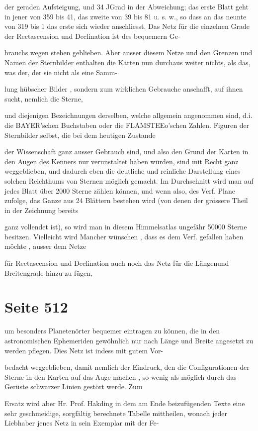 \documentclass[10pt,a4paper]{article}
\begin{document}
der geraden Aufsteigung, und 34 JGrad in der Abweichung; das erste Blatt geht in jener von 359\textdegree{} bis 41\textdegree{}, das zweite von 39\textdegree{} bis 81 u. s. w., so dass an das neunte von 319\textdegree{} bis 1\textdegree{} das erste sich wieder anschliesst. Das Netz für die einzelnen Grade der Rectascension und Declination ist des bequemern Ge-

brauchs wegen stehen geblieben. Aber ausser diesem Netze und den Grenzen und Namen der Sternbilder enthalten die Karten nun durchaus weiter nichts, als das, was der, der sie nicht als eine Samm-

lung hübscher Bilder , sondern zum wirklichen Gebrauche anschafft, auf ihnen sucht, nemlich die Sterne,

und diejenigen Bezeichnungen derselben, welche allgemein angenommen sind, d.i. die BAYER'schen Buchstaben oder die FLAMSTEEo'schen Zahlen. Figuren der Sternbilder selbst, die bei dem heutigen Zustande

der Wissenschaft ganz ausser Gebrauch sind, und also den Grund der Karten in den Augen des Kenners nur verunstaltet haben würden, sind mit Recht ganz weggeblieben, und dadurch eben die deutliche und reinliche Darstellung eines solchen Reichthums von Sternen möglich gemacht. Im Durchschnitt wird man auf jedes Blatt über 2000 Sterne zählen können, und wenn also, des Verf. Plane zufolge, das Ganze aus 24 Blättern bestehen wird (von denen der grössere Theil in der Zeichnung bereits

ganz vollendet ist), so wird man in diesem Himmelsatlas ungefähr 50000 Sterne besitzen. Vielleicht wird Mancher wünschen , dass es dem Verf. gefallen haben möchte , ausser dem Netze

für Rectascension und Declination auch noch das Netz für die Längenund Breitengrade hinzu zu fügen,


\newpage
\section*{Seite 512}
um besonders Planetenörter bequemer eintragen zu können, die in den astronomischen Ephemeriden gewöhnlich nur nach Länge und Breite angesetzt zu werden pflegen. Dies Netz ist indess mit gutem Vor-

bedacht weggeblieben, damit nemlich der Eindruck, den die Configurationen der Sterne in den Karten auf das Auge machen , so wenig als möglich durch das Gerüste schwarzer Linien gestört werde. Zum

Ersatz wird aber Hr. Prof. Hakding in dem am Ende beizufügenden Texte eine sehr geschmeidige, sorgfältig berechnete Tabelle mittheilen, wonach jeder Liebhaber jenes Netz in sein Exemplar mit der Fe-
\end{document}
